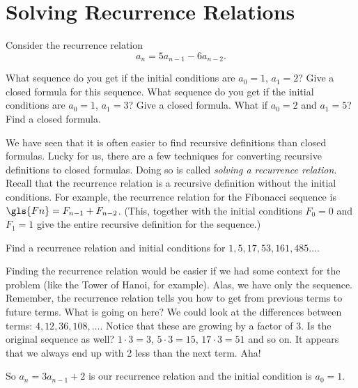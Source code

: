 \documentclass[12pt]{article}
\begin{document}
\section{Solving Recurrence Relations}

\begin{activity}
Consider the recurrence relation
\[a_n = 5a_{n-1} - 6a_{n-2}.\]

\begin{questions}
\question What sequence do you get if the initial conditions are $a_0 = 1$, $a_1 = 2$?  Give a closed formula for this sequence.
\question What sequence do you get if the initial conditions are $a_0 = 1$, $a_1 = 3$?  Give a closed formula.
\question What if $a_0 = 2$ and $a_1 = 5$?  Find a closed formula.
\end{questions}
\end{activity}

We have seen that it is often easier to find recursive definitions than closed formulas.  Lucky for us, there are a few techniques for converting recursive definitions to closed formulas.  Doing so is called \emph{solving a recurrence relation}.  Recall that the recurrence relation is a recursive definition without the initial conditions.  For example, the recurrence relation for the Fibonacci sequence is $\gls{Fn} = F_{n-1} + F_{n-2}$.  (This, together with the initial conditions $F_0 = 0$ and $F_1 = 1$ give the entire recursive definition for the sequence.)

\begin{example}
  Find a recurrence relation and initial conditions for $1, 5, 17, 53, 161, 485\ldots$.
  \begin{solution}
    Finding the recurrence relation would be easier if we had some context for the problem (like the Tower of Hanoi, for example).  Alas, we have only the sequence.  Remember, the recurrence relation tells you how to get from previous terms to future terms.  What is going on here?  We could look at the differences between terms: $4, 12, 36, 108, \ldots$.  Notice that these are growing by a factor of 3.  Is the original sequence as well?  $1\cdot 3 = 3$, $5 \cdot 3 = 15$, $17 \cdot 3 = 51$ and so on.  It appears that we always end up with 2 less than the next term.  Aha!

    So $a_n = 3a_{n-1} + 2$ is our recurrence relation and the initial condition is $a_0 = 1$.
  \end{solution}

\end{example}
\end{document}
